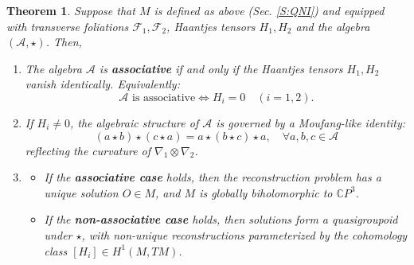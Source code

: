 \documentclass[10pt,a4paper]{amsart}
\newtheorem{thm}{Theorem}
\begin{document}
\begin{thm}
Suppose that \( M \) is defined as above (Sec. \ref{S:QNI})  and equipped with transverse foliations \( \mathcal{F}_1, \mathcal{F}_2 \), Haantjes tensors \( H_1, H_2 \) and the algebra $(\mathcal{A} , \star)$. Then,
\begin{enumerate}
    \item The algebra \( \mathcal{A} \) is {\bf associative} if and only if the Haantjes tensors \( H_1, H_2 \) vanish identically. Equivalently:
    \[
    \mathcal{A} \text{ is associative} \iff H_i = 0 \quad (i = 1, 2).
    \]
    \item If \( H_i \neq 0 \), the algebraic structure of \( \mathcal{A} \) is governed by a Moufang-like identity:
    \[
    (a \star b) \star (c \star a) = a \star (b \star c) \star a, \quad \forall a,b,c \in \mathcal{A}
    \]
    reflecting the curvature of \( \nabla_1 \otimes \nabla_2 \).
    \item \begin{itemize} 
    \item If the {\bf associative case} holds, then the reconstruction problem has a unique solution \( O \in M \), and \( M \) is globally biholomorphic to \( \mathbb{C}P^3 \). 
    \item If the {\bf non-associative case} holds, then solutions form a quasigroupoid under \( \star \), with non-unique reconstructions parameterized by the cohomology class \( [H_i] \in H^1(M, TM) \).
    \end{itemize}
\end{enumerate}
\end{thm}
\end{document}

